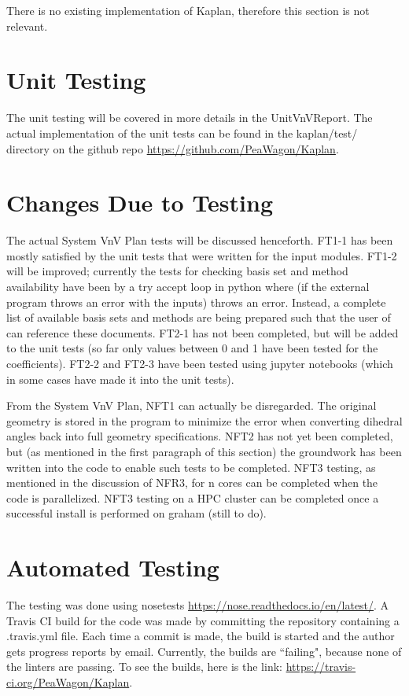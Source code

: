 \documentclass[12pt, titlepage]{article}
\begin{document}
There is no existing implementation of Kaplan, therefore this section is not 
relevant.

\section{Unit Testing}

The unit testing will be covered in more details in the UnitVnVReport. The 
actual implementation of the unit tests can be found in the kaplan/test/ 
directory on the github repo \url{https://github.com/PeaWagon/Kaplan}.

\section{Changes Due to Testing}

The actual System VnV Plan tests will be discussed henceforth. FT1-1 has been 
mostly satisfied by the unit tests that were written for the input modules. 
FT1-2 will be improved; currently the tests for checking basis set and method 
availability have been by a try accept loop in python where (if the external 
program throws an error with the inputs) \progname{} throws an error. Instead, 
a complete list of available basis sets and methods are being prepared such 
that the user of \progname{} can reference these documents. FT2-1 has not been 
completed, but will be added to the unit tests (so far only values between 0 
and 1 have been tested for the coefficients). FT2-2 and FT2-3 have been tested 
using jupyter notebooks (which in some cases have made it into the unit tests).

From the System VnV Plan, NFT1 can actually be disregarded. The original 
geometry is stored in the program to minimize the error when converting 
dihedral angles back into full geometry specifications. NFT2 has not yet been 
completed, but (as mentioned in the first paragraph of this section) the 
groundwork has been written into the code to enable such tests to be completed. 
NFT3 testing, as mentioned in the discussion of NFR3, for n cores can be 
completed when the code is parallelized. NFT3 testing on a HPC cluster can be 
completed once a successful install is performed on graham (still to do).

\section{Automated Testing}\label{section-auto-testing}

The testing was done using nosetests 
\url{https://nose.readthedocs.io/en/latest/}. A Travis CI build for the code 
was made by committing the repository containing a .travis.yml file. Each time 
a commit is made, the build is started and the author gets progress reports by 
email. Currently, the builds are ``failing", because none of the linters are 
passing. To see the builds, here is the link: 
\url{https://travis-ci.org/PeaWagon/Kaplan}.
\end{document}
